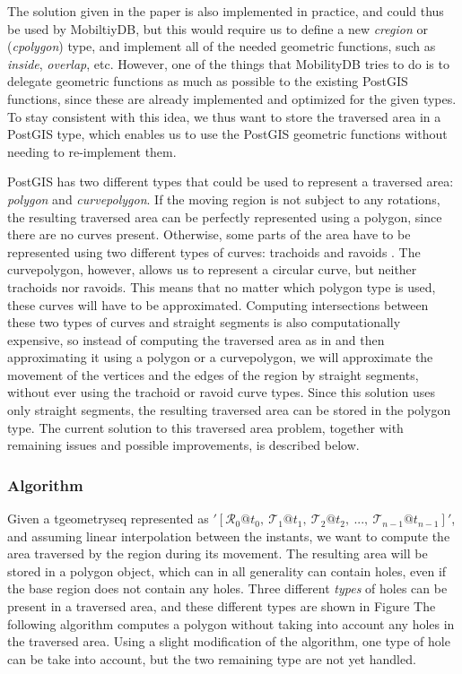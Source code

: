 The solution given in the paper is also implemented in practice, and could thus be used by MobiltiyDB, but this would require us to define a new \textit{cregion} or (\textit{cpolygon}) type, and implement all of the needed geometric functions, such as \textit{inside}, \textit{overlap}, etc. However, one of the things that MobilityDB tries to do is to delegate geometric functions as much as possible to the existing PostGIS functions, since these are already implemented and optimized for the given types. To stay consistent with this idea, we thus want to store the traversed area in a PostGIS type, which enables us to use the PostGIS geometric functions without needing to re-implement them.

PostGIS has two different types that could be used to represent a traversed area: \textit{polygon} and \textit{curvepolygon}. If the moving region is not subject to any rotations, the resulting traversed area can be perfectly represented using a polygon, since there are no curves present. Otherwise, some parts of the area have to be represented using two different types of curves: trachoids and ravoids \cite{fmregion}. The curvepolygon, however, allows us to represent a circular curve, but neither trachoids nor ravoids. This means that no matter which polygon type is used, these curves will have to be approximated. Computing intersections between these two types of curves and straight segments is also computationally expensive, so instead of computing the traversed area as in \cite{fmregion} and then approximating it using a polygon or a curvepolygon, we will approximate the movement of the vertices and the edges of the region by straight segments, without ever using the trachoid or ravoid curve types. Since this solution uses only straight segments, the resulting traversed area can be stored in the polygon type. The current solution to this traversed area problem, together with remaining issues and possible improvements, is described below.

\subsubsection{Algorithm}

Given a tgeometryseq represented as $'[\mathcal{R}_0@t_0,\ \mathcal{T}_1@t_1,\ \mathcal{T}_2@t_2,\ ..., \ \mathcal{T}_{n-1}@t_{n-1}]'$, and assuming linear interpolation between the instants, we want to compute the area traversed by the region during its movement. The resulting area will be stored in a polygon object, which can in all generality can contain holes, even if the base region does not contain any holes. Three different \textit{types} of holes can be present in a traversed area, and these different types are shown in Figure  The following algorithm computes a polygon without taking into account any holes in the traversed area. Using a slight modification of the algorithm, one type of hole can be take into account, but the two remaining type are not yet handled.

